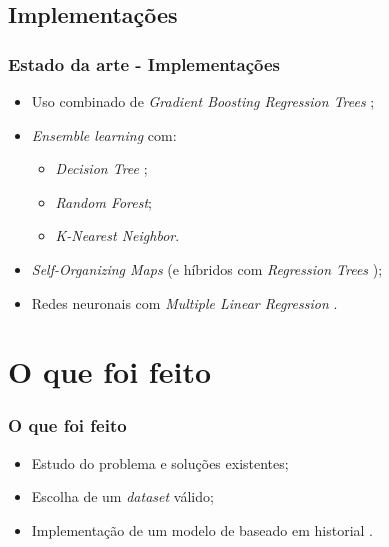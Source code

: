 \documentclass{beamer}
\begin{document}
\subsection[Implementacoes]{Implementações}
\begin{frame}[label={Implementacoes}]
\frametitle{Estado da arte - Implementações}

\let\oldfootnotesize\footnotesize
\renewcommand*{\footnotesize}{\oldfootnotesize\tiny}

\begin{itemize}
	\item Uso combinado de \textit{Gradient Boosting Regression Trees}
		  ;
	\item \textit{Ensemble learning}  com: 
		  \begin{itemize}
			  \item \textit{Decision Tree };
			  \item \textit{Random Forest};
			  \item \textit{K-Nearest Neighbor}.
		  \end{itemize}
	\item \textit{Self-Organizing Maps} 
		  (e híbridos com \textit{Regression Trees} );
	\item Redes neuronais com \textit{Multiple Linear Regression} 
		  .
\end{itemize}

\renewcommand*{\footnotesize}{\oldfootnotesize}

\end{frame}

\section[Development]{O que foi feito}
\begin{frame}
\frametitle{O que foi feito}

\begin{itemize}
	\item Estudo do problema e soluções existentes;
	\item Escolha de um \textit{dataset} válido;
	\item Implementação de um modelo de baseado em historial .
\end{itemize}

\end{frame}
\end{document}
